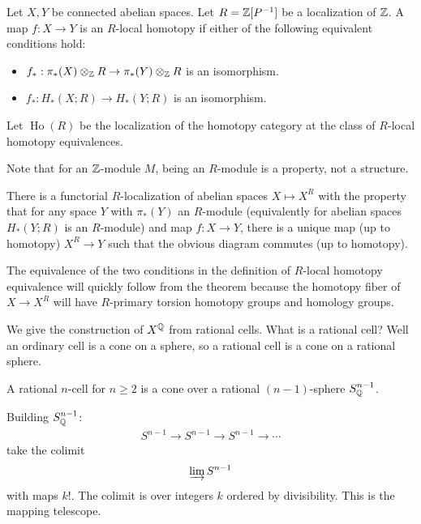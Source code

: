 \documentclass[12pt]{article}
\begin{document}
\begin{definition}
    Let $X,Y$ be connected abelian spaces. Let $R = \mathbb{Z}[P^{-1}]$ be a localization of $\mathbb{Z}$. A map $f:X\to Y$ is an $R$-local homotopy if either of the following equivalent conditions hold:
    \begin{itemize}
        \item $f_*:\pi_*(X)\otimes_{\mathbb{Z}} R \to \pi_*(Y)\otimes_{\mathbb{Z}} R$ is an isomorphism.
        \item $f_*:H_*(X;R) \to H_*(Y;R)$ is an isomorphism.
    \end{itemize}
Let $\operatorname{Ho}(R)$ be the localization of the homotopy category at the class of $R$-local homotopy equivalences. 
\end{definition}

Note that for an $\mathbb{Z}$-module $M$, being an $R$-module is a property, not a structure. 
\begin{theorem}
    There is a functorial $R$-localization of abelian spaces $X\mapsto X^R$ with the property that for any space $Y$ with $\pi_*(Y)$ an $R$-module (equivalently for abelian spaces $H_*(Y;R)$ is an $R$-module) and map $f:X\to Y$, there is a unique map (up to homotopy) $X^R \to Y$ such that the 
obvious diagram commutes (up to homotopy).
\end{theorem}
The equivalence of the two conditions in the definition of $R$-local homotopy equivalence will quickly follow from the theorem because the homotopy fiber of $X \to X^R$ will have $R$-primary torsion homotopy groups and homology groups.

We give the construction of $X^{\mathbb{Q}}$ from rational cells. What is a rational cell? Well an ordinary cell is a cone on a sphere, so a rational cell is a cone on a rational sphere. 

\begin{definition}
    A rational $n$-cell for $n\geq 2$ is a cone over a rational $(n-1)$-sphere $S^{n-1}_{\mathbb{Q}}$.
\end{definition}
Building $S^{n-1}_{\mathbb{Q}}$: 
\begin{align*}
    S^{n-1} \to S^{n-1} \to S^{n-1} \to \cdots
\end{align*} take the colimit \begin{align*}
    \varinjlim S^{n-1} 
\end{align*} with maps $k!$. The colimit is over integers $k$ ordered by divisibility. This is the mapping telescope.
\end{document}
